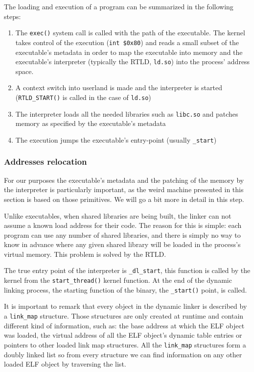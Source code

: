 \documentclass[11pt,twoside,a4paper]{article}
\begin{document}
The loading and execution of a program can be summarized in the following steps:
\begin{enumerate}
\item The \texttt{exec()} system call is called with the path of the executable. The kernel takes control of the execution (\texttt{int \$0x80}) and reads a small subset of the executable's metadata in order to map the executable into memory and the executable's interpreter (typically the RTLD, \texttt{ld.so}) into the process' address space.
\item A context switch into userland is made and the interpreter is started (\texttt{RTLD\_START()} is called in the case of \texttt{ld.so})
\item The interpreter loads all the needed libraries such as \texttt{libc.so} and patches memory as specified by the executable's metadata
\item The execution jumps the executable's entry-point (usually \texttt{\_start})
\end{enumerate}

\subsubsection{Addresses relocation} 
For our purposes the executable's metadata and the patching of the memory by the interpreter is particularly important, as the weird machine presented in this section is based on those primitives. We will go a bit more in detail in this step.

Unlike executables, when shared libraries are being built, the linker can not assume a known load address for their code. The reason for this is simple: each program can use any number of shared libraries, and there is simply no way to know in advance where any given shared library will be loaded in the process's virtual memory. This problem is solved by the RTLD.

The true entry point of the interpreter is \texttt{\_dl\_start}, this function is called by the kernel from the \texttt{start\_thread()} kernel function. At the end of the dynamic linking process, the starting function of the binary, the \texttt{\_start()} point, is called. \cite{eresi}

It is important to remark that every object in the dynamic linker is described by a \texttt{link\_map} structure. Those structures are only created at runtime and contain different kind of information, such as: the base address at which the ELF object was loaded, the virtual address of all the ELF object's dynamic table entries or pointers to other loaded link map structures. All the \texttt{link\_map} structures form a doubly linked list so from every structure we can find information on any other loaded ELF object by traversing the list.
\end{document}
